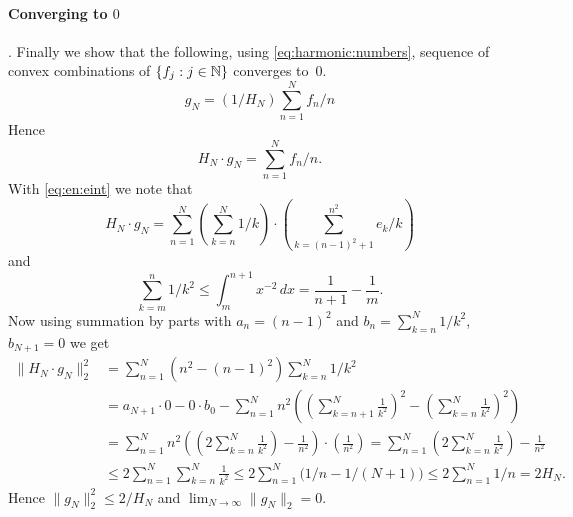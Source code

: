 \begin{enumerate}
\paragraph{Converging to $0$}.
Finally we show that the following, using \eqref{eq:harmonic:numbers},
sequence of convex combinations of \(\{f_j: j\in\mathbb{N}\}\) converges to~$0$.
\begin{equation*}
g_N = (1/H_N)\sum_{n=1}^N f_n /n
\end{equation*}
Hence
\begin{equation*}
H_N \cdot g_N = \sum_{n=1}^N f_n/n.
\end{equation*}
With \eqref{eq:en:eint} we note that
\begin{equation*}
H_N \cdot g_N = \sum_{n=1}^N \left(\sum_{k=n}^N 1/k\right)\cdot
   \left(\sum_{k=(n-1)^2+1}^{n^2} e_k/k\right)
\end{equation*}
and
\begin{equation*}
\sum_{k=m}^n 1/k^2 \leq \int_m^{n+1} x^{-2}\,dx
= \frac{1}{n+1} - \frac{1}{m}.
\end{equation*}
Now using summation by parts
with \(a_n=(n-1)^2\) and \(b_n = \sum_{k=n}^N 1/k^2\), \(b_{N+1} = 0\)
we get
\begin{align*}
\|H_N \cdot g_N\|_2^2
&= \sum_{n=1}^N \left(n^2 - (n-1)^2\right) \sum_{k=n}^N 1/k^2 \\
&= a_{N+1} \cdot 0 - 0 \cdot b_0
  - \sum_{n=1}^N n^2
    \left(
      \left(\sum_{k=n+1}^N \frac{1}{k^2}\right)^2
      -
      \left(\sum_{k=n}^N \frac{1}{k^2}\right)^2
    \right) \\
&= \sum_{n=1}^N n^2
   \left(
     \left(2\sum_{k=n}^N \frac{1}{k^2}\right) - \frac{1}{n^2}
   \right)
   \cdot \left(\frac{1}{n^2}\right)
 = \sum_{n=1}^N \left(2\sum_{k=n}^N \frac{1}{k^2}\right) - \frac{1}{n^2} \\
&\leq 2 \sum_{n=1}^N \sum_{k=n}^N \frac{1}{k^2}
 \leq 2 \sum_{n=1}^N \bigl(1/n - 1/(N+1)\bigr)
 \leq 2 \sum_{n=1}^N 1/n  = 2H_N.
\end{align*}
Hence
\(\|g_N\|_2^2 \leq 2/H_N \)
and
\(\lim_{N\to\infty} \|g_N\|_2 = 0\).



\end{enumerate}
